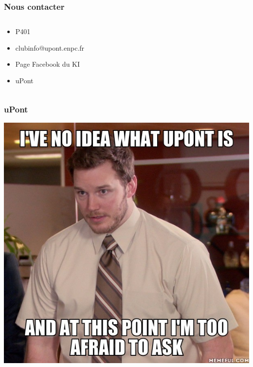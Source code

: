 \documentclass[14pt]{beamer}
\begin{document}
\begin{frame}
    \frametitle{Nous contacter}
    \begin{columns}
        \begin{column}{.55\textwidth}
        \begin{itemize}
            \item P401
            \item clubinfo@upont.enpc.fr
            \item Page Facebook du KI
            \item uPont
        \end{itemize}
        \end{column}
        \begin{column}{.45\textwidth}
        {%
            \setlength{\fboxsep}{0pt}%
            \setlength{\fboxrule}{0.3pt}%
        }%
        \end{column}
  \end{columns}
\end{frame}

\begin{frame}
    \frametitle{uPont}
    \begin{center}
        \includegraphics[height=0.6\textheight]{upont-1.png}
     \end{center}
\end{frame}
\end{document}
